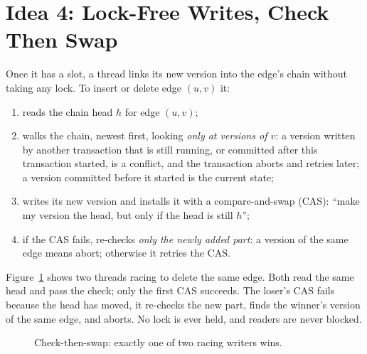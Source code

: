 \documentclass[11pt,a4paper,oneside]{report}
\begin{document}
\section{Idea 4: Lock-Free Writes, Check Then Swap}
Once it has a slot, a thread links its new version into the edge's chain without taking any lock. To insert or delete
edge $(u,v)$ it:
\begin{enumerate}
\item reads the chain head $h$ for edge $(u,v)$;
\item walks the chain, newest first, looking \emph{only at versions of $v$}: a version written by another transaction
  that is still running, or committed after this transaction started, is a conflict, and the transaction aborts and
  retries later; a version committed before it started is the current state;
\item writes its new version and installs it with a compare-and-swap (CAS): ``make my version the head, but only if the
  head is still $h$'';
\item if the CAS fails, re-checks \emph{only the newly added part}: a version of the same edge means abort; otherwise it
  retries the CAS.
\end{enumerate}

Figure~\ref{fig:cas} shows two threads racing to delete the same edge. Both read the same head and pass the check; only
the first CAS succeeds. The loser's CAS fails because the head has moved, it re-checks the new part, finds the winner's
version of the same edge, and aborts. No lock is ever held, and readers are never blocked.

\begin{figure}[H]
\centering
{}
\caption{Check-then-swap: exactly one of two racing writers wins.}
\label{fig:cas}
\end{figure}
\end{document}
